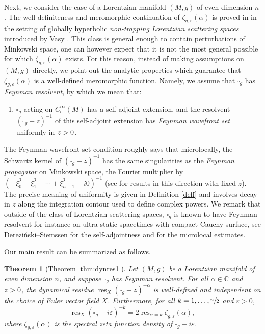\documentclass[JEP,XML,SOM,Unicode]{cedram}
\newtheorem{theorem}{Theorem}[section]
\theoremstyle{definition}
\newcommand\cc{{\mathbb C}}
\renewcommand\c{\mathrm{c}}
\let\cv\alpha
\let\euler X
\let\Im\relax
\DeclareMathOperator{\Im}{Im}
\DeclareMathOperator{\resnorm}{res}
\DeclareMathOperator*{\res}{res}
\newcommand{\resdyn}{{\resnorm_\euler}}
\begin{document}
Next, we consider the case of a Lorentzian manifold $(M,g)$ of even dimension $n$.
The well-definiteness and meromorphic continuation of $\zeta_{g,\varepsilon}(\cv)$ is proved in \cite{Dang2020} in the setting of globally hyperbolic \emph{non-trapping Lorentzian scattering spaces} introduced by Vasy \cite{vasyessential}. This class is general enough to contain perturbations of Minkowski space, one can however expect that it is not the most general possible for which $\zeta_{g,\varepsilon}(\cv)$ exists. For this reason, instead of making assumptions on $(M,g)$ directly, we point out the analytic properties which guarantee that $\zeta_{g,\varepsilon}(\cv)$ is a well-defined meromorphic function. Namely, we assume that $\square_g$ has \emph{Feynman resolvent}, by which we mean that:
\begin{enumerate}
\item[] $\square_g$ acting on $C_\c^\infty(M)$ has a self-adjoint extension, and the resolvent $(\square_g-z)^{-1}$ of this self-adjoint extension has \emph{Feynman wavefront set} uniformly in $\Im z >0$.
\end{enumerate}

The Feynman wavefront set condition roughly says that microlocally, the Schwartz kernel of $(\square_g-z)^{-1}$ has the same singularities as the \emph{Feynman propagator} on Minkowski space, \ie the Fourier multiplier by $(-\xi_0^2 + \xi_1^2 + \cdots+ \xi_{n-1}^2 - i0)^{-1}$ (see \cite{GHV,Vasy2017b,vasywrochna,GWfeynman,Gerard2019b,Taira2020a} for results in this direction with fixed $z$).
The precise meaning of uniformity is given in Definition \ref{deff} and involves decay in $z$ along the integration contour used to define complex powers. We remark that outside of the class of Lorentzian scattering spaces, $\square_g$ is known to have Feynman resolvent for instance on ultra-static spacetimes with compact Cauchy surface, see Derezi\'nski--Siemssen \cite{derezinski} for the self-adjointness and \cite{Dang2020} for the microlocal estimates.

Our main result can be summarized as follows.

\begin{theorem}[{\cf Theorem \ref{thm:dynres1}}]\label{thm:dynres} Let $(M,g)$ be a Lorentzian manifold of even dimension $n$, and suppose $\square_g$ has Feynman resolvent. For all $\cv\in\cc$ and $\Im z > 0$, the dynamical residue $\resdyn(\square_g-z)^{-\cv}$ is well-defined and independent on the choice of Euler vector field $\euler$. Furthermore, for all $k=1,\dots,\sfrac{n}{2}$ and $\varepsilon>0$,
\begin{equation}\label{eq:main}
\resdyn \left(\square_g-i \varepsilon \right)^{-k} = {2}\res_{\cv =k}\zeta_{g,\varepsilon}(\cv),
\end{equation}
where $\zeta_{g,\varepsilon}(\cv)$ is the spectral zeta function density of $\square_g-i \varepsilon$.
\end{theorem}
\end{document}
